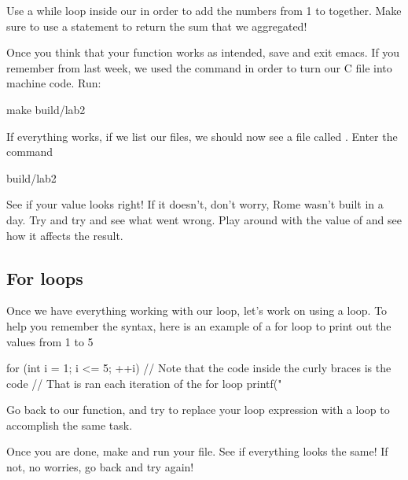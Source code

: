\documentclass{tufte-handout}
\begin{document}
Use a while loop inside our  in order to add the numbers from 1 to  together.
Make sure to use a  statement to return the sum that we aggregated!

Once you think that your function works as intended, save and exit emacs. If you remember from last week, we used the  command in order to turn our C file into machine code. Run:
\begin{CmdLine}
  \prompt make build/lab2
\end{CmdLine}
If everything works, if we list our files, we should now see a file called .  Enter the command
\begin{CmdLine}
  \prompt build/lab2
\end{CmdLine}
See if your value looks right!  If it doesn't, don't worry, Rome wasn't
built in a day.  Try and try and see what went wrong.  Play around with the value of  and see how it affects the result.

\subsection{For loops}


Once we have everything working with our  loop, let's work on using a  loop.  To help you remember the syntax, here is an example of a for loop to print out the values from 1 to 5

\begin{Code}
    for (int i = 1; i <= 5; ++i) {
        // Note that the code inside the curly braces is the code
        // That is ran each iteration of the for loop
        printf("%
    }
\end{Code}

Go back to our  function, and try to replace your  loop expression with a  loop to accomplish the same task.

Once you are done, make and run your file.  See if everything looks the same!  If not, no worries, go back and try again!
\end{document}
